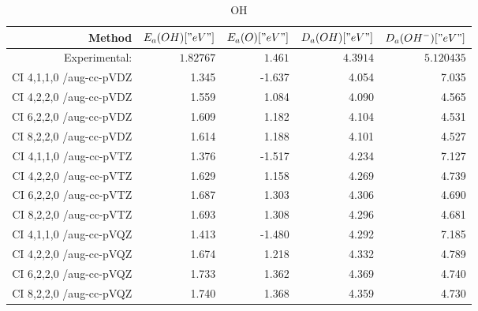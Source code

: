 \begin{table}[]
\centering
\caption{OH}
\label{TODO}
\begin{tabular}{rrrrr}
\toprule
Method & $E_a(OH)[" eV"]$ & $E_a(O)[" eV"]$ & $D_a(OH)[" eV"]$ & $D_a(OH^-)[" eV"]$ \\ \midrule
Experimental:  & $1.82767$ & $1.461$ &        $4.3914$ & $5.120435$ \\ \midrule
CI 4,1,1,0 /aug-cc-pVDZ & 1.345 & -1.637 & 4.054 & 7.035\\
CI 4,2,2,0 /aug-cc-pVDZ & 1.559 & 1.084 & 4.090 & 4.565\\
CI 6,2,2,0 /aug-cc-pVDZ & 1.609 & 1.182 & 4.104 & 4.531\\
CI 8,2,2,0 /aug-cc-pVDZ & 1.614 & 1.188 & 4.101 & 4.527\\
CI 4,1,1,0 /aug-cc-pVTZ & 1.376 & -1.517 & 4.234 & 7.127\\
CI 4,2,2,0 /aug-cc-pVTZ & 1.629 & 1.158 & 4.269 & 4.739\\
CI 6,2,2,0 /aug-cc-pVTZ & 1.687 & 1.303 & 4.306 & 4.690\\
CI 8,2,2,0 /aug-cc-pVTZ & 1.693 & 1.308 & 4.296 & 4.681\\
CI 4,1,1,0 /aug-cc-pVQZ & 1.413 & -1.480 & 4.292 & 7.185\\
CI 4,2,2,0 /aug-cc-pVQZ & 1.674 & 1.218 & 4.332 & 4.789\\
CI 6,2,2,0 /aug-cc-pVQZ & 1.733 & 1.362 & 4.369 & 4.740\\
CI 8,2,2,0 /aug-cc-pVQZ & 1.740 & 1.368 & 4.359 & 4.730\\
\bottomrule
\end{tabular}
\end{table}
    